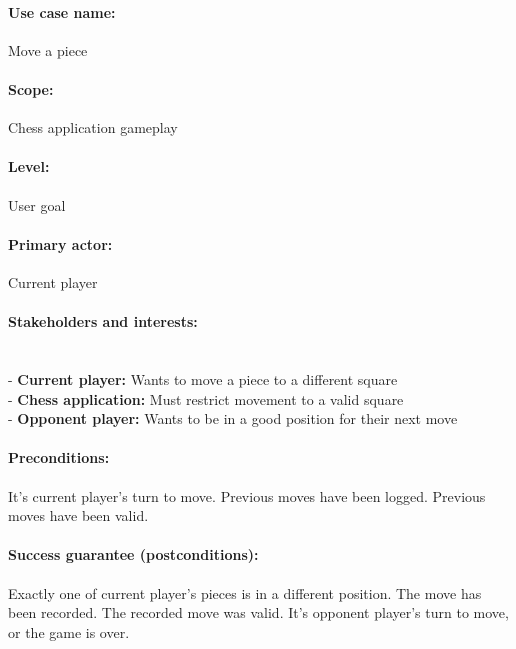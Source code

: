 \documentclass{article}
\begin{document}
\paragraph{Use case name:} Move a piece

\paragraph{Scope:} Chess application gameplay

\paragraph{Level:} User goal

\paragraph{Primary actor:} Current player

\paragraph{Stakeholders and interests:}\mbox{}\\
- \textbf{Current player:} Wants to move a piece to a different square\\
- \textbf{Chess application:} Must restrict movement to a valid square\\
- \textbf{Opponent player:} Wants to be in a good position for their next move

\paragraph{Preconditions:} It's current player's turn to move. Previous moves have been logged. Previous moves have been valid.

\paragraph{Success guarantee (postconditions):} Exactly one of current player's pieces is in a different position. The move has been recorded. The recorded move was valid. It's opponent player's turn to move, or the game is over.
\end{document}
